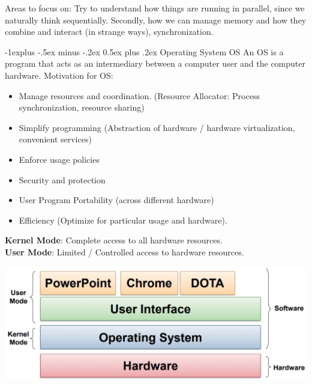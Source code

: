 \documentclass[10pt, landscape]{article}
\makeatletter
\renewcommand{\subsection}{\@startsection{subsection}{2}{0mm}%
                                {-1explus -.5ex minus -.2ex}%
                                {0.5ex plus .2ex}%
                                {\normalfont\normalsize\bfseries}}
\makeatother
\begin{document}
\begin{multicols*}{3}
Areas to focus on: Try to understand how things are running in parallel, since we naturally think sequentially. Secondly, how we can manage memory and how they combine and interact (in strange ways), synchronization.

\subsection{Operating System OS}
An OS is a program that acts as an intermediary between a computer user and the computer hardware. Motivation for OS:
\begin{itemize}
\item Manage resources and coordination. (Resource Allocator: Process synchronization, resource sharing)
\item Simplify programming (Abstraction of hardware / hardware virtualization, convenient services)
\item Enforce usage policies
\item Security and protection
\item User Program Portability (across different hardware)
\item Efficiency (Optimize for particular usage and hardware).
\end{itemize}

\textbf{Kernel Mode}: Complete access to all hardware resources. \\
\textbf{User Mode}: Limited / Controlled access to hardware resources.

\hspace{0.5cm}

\centerline{\includegraphics[width=0.5\linewidth]{highlevelOS}}


\end{multicols*}
\end{document}
